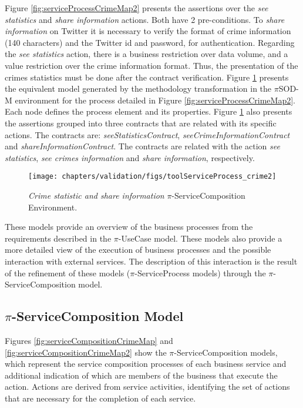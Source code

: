 Figure \ref{fig:serviceProcessCrimeMap2} presents the assertions over the
 \textit{see statistics} and \textit{share information} actions. Both have 2 
pre-conditions. To \textit{share information} on Twitter it is necessary
to verify the format of crime information (140 characters) and the Twitter id
and password, for authentication. Regarding the \textit{see statistics} action, there is a
business restriction over data volume, and a value restriction over the crime
information format. Thus, the presentation of the crimes statistics must be done
after the contract verification. Figure
\ref{fig:toolserviceProcessCrimeMap2} presents the equivalent model
generated by the methodology transformation in the $\pi$SOD-M environment for
the process detailed in Figure \ref{fig:serviceProcessCrimeMap2}. Each node
defines the process element and its properties. Figure
\ref{fig:toolserviceProcessCrimeMap2} also presents the assertions grouped
into three contracts that are related with its specific actions. The contracts
are: \textit{seeStatisticsContract}, \textit{seeCrimeInformationContract} and
\textit{shareInformationContract}. The contracts are related with the action
\textit{see statistics}, \textit{see crimes information} and \textit{share
information}, respectively. 

\begin{figure}[ht!]    
\centering
\texttt{[image: chapters/validation/figs/toolServiceProcess\_crime2]}
\caption{\textit{Crime statistic and share information}
$\pi$-ServiceComposition Environment.}
\label{fig:toolserviceProcessCrimeMap2}
\end{figure} 


These models provide an overview of the business processes from the requirements
described in the $\pi$-UseCase model. These models also provide a more detailed
view of the execution of business processes and the possible
interaction with external services. The description of this interaction is the
result of the refinement of these models ($\pi$-ServiceProcess models) through
the $\pi$-ServiceComposition model.

\subsection{$\pi$-ServiceComposition Model}
\label{sec:servicecomposition_crimesMap} 

Figures \ref{fig:serviceCompositionCrimeMap} and
\ref{fig:serviceCompositionCrimeMap2} show the $\pi$-ServiceComposition models,
which represent the service composition processes of each
business service and additional indication of which are members of the business
that execute the action. Actions are derived from service activities,
identifying the set of actions that are necessary for the completion of each service.


